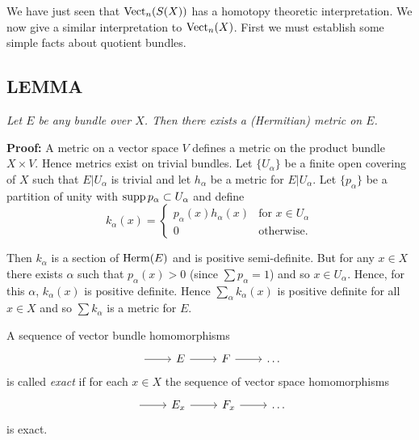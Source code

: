 We have just seen that $\operatorname{Vect}_n(S(X))$ has a homotopy theoretic interpretation. We now give a similar interpretation to $\operatorname{Vect}_n(X)$. First we must establish some simple facts about quotient bundles. \par 

\subsection{LEMMA}\label{lem:1.4.10} \textit{Let $E$ be any bundle over $X$. Then there exists a (Hermitian) metric on $E$.} \par 

\textbf{Proof:} A metric on a vector space $V$ defines a metric on the product bundle $X \times V$. Hence metrics exist on trivial bundles. Let $\{U_\alpha\}$ be a finite open covering of $X$ such that $E \vert U_\alpha$ is trivial and let $h_\alpha$ be a metric for $E \vert U_\alpha$. Let $\{p_\alpha\}$ be a partition of unity with $\operatorname{supp} p_\alpha \subset U_\alpha$ and define
\begin{equation*}
k_\alpha(x) =
    \begin{cases}
        p_\alpha(x) h_\alpha(x) & \text{for $x \in U_\alpha$} \\
        0 & \text{otherwise.}
    \end{cases}
\end{equation*}

Then $k_\alpha$ is a section of $\operatorname{Herm}(E)$ and is positive semi-definite. But for any $x \in X$ there exists $\alpha$ such that $p_\alpha(x) > 0$ (since $\sum p_\alpha = 1$) and so $x \in U_\alpha$. Hence, for this $\alpha$, $k_\alpha(x)$ is positive definite. Hence $\sum_\alpha k_\alpha(x)$ is positive definite for all $x \in X$ and so $\sum k_\alpha$ is a metric for $E$. \par 

A sequence of vector bundle homomorphisms
\begin{equation*}
    \begin{tikzcd}
    {} \arrow[r] & E \arrow[r] & F \arrow[r] & \ldots
    \end{tikzcd}
\end{equation*}
is called \textit{exact} if for each $x \in X$ the sequence of vector space homomorphisms
\begin{equation*}
    \begin{tikzcd}
    {} \arrow[r] & E_x \arrow[r] & F_x \arrow[r] & \ldots
    \end{tikzcd}
\end{equation*}
is exact. \par 

